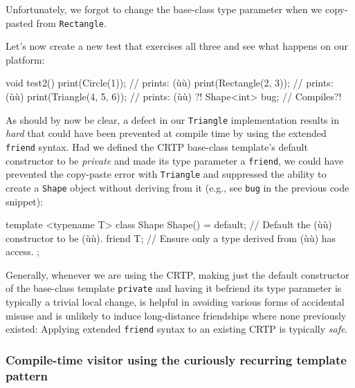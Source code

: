 \noindent Unfortunately, we forgot to change the base-class type parameter when we
copy-pasted from \lstinline!Rectangle!.

Let's now create a new test that exercises all three and see what
happens on our platform:

\begin{emcppslisting}[emcppsbatch=e7]
void test2()
{
    print(Circle(1));          // prints: (ù{}ù)
    print(Rectangle(2, 3));    // prints: (ù{}ù)
    print(Triangle(4, 5, 6));  // prints: (ù{}ù) ?!
    Shape<int> bug;            // Compiles?!
}
\end{emcppslisting}

\noindent As should by now be clear, a defect in our \lstinline!Triangle!
implementation results in \emph{hard}  that
could have been prevented at compile time by using the extended
\lstinline!friend! syntax. Had we defined the CRTP base-class template's
default constructor to be \emph{private} and made its type parameter a
\lstinline!friend!, we could have prevented the copy-paste error with
\lstinline!Triangle! and suppressed the ability to create a \lstinline!Shape!
object without deriving from it (e.g., see \lstinline!bug! in the previous
code snippet):

\begin{emcppslisting}[emcppsbatch=e8]
template <typename T>
class Shape
{
    Shape() = default;  // Default the (ù{}ù) constructor to be (ù{}ù).
    friend T;           // Ensure only a type derived from (ù{}ù) has access.
};
\end{emcppslisting}

\noindent Generally, whenever we are using the CRTP, making just the
default constructor of the base-class template \lstinline!private! and
having it befriend its type parameter is typically a trivial local
change, is helpful in avoiding various forms of accidental misuse and
is unlikely to induce long-distance friendships where none previously
existed: Applying extended \lstinline!friend! syntax to an existing CRTP
is typically \emph{safe}.

\subsubsection[Compile-time visitor using the curiously recurring template pattern]{Compile-time visitor using the curiously recurring template pattern}\label{compile-time-visitor-using-crtp}

